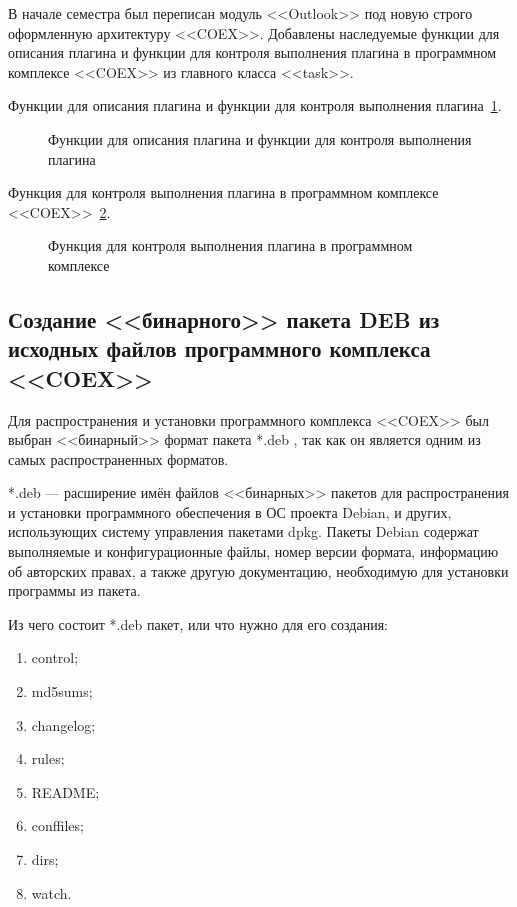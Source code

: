 В начале семестра был переписан модуль <<Outlook>> под новую строго оформленную архитектуру <<COEX>>.
Добавлены наследуемые функции для описания плагина и функции для контроля выполнения плагина в программном комплексе <<COEX>> из главного класса <<task>>.

Функции для описания плагина и функции для контроля выполнения плагина~\ref{Outlook:Outlook}.

\begin{figure}[h!]
\caption{ Функции для описания плагина и функции для контроля выполнения плагина }
\label{Outlook:Outlook}
\end{figure}

Функция для контроля выполнения плагина в программном комплексе <<COEX>>~\ref{Outlook2:Outlook2}.

\begin{figure}[h!]
\caption{ Функция для контроля выполнения плагина в программном комплексе }
\label{Outlook2:Outlook2}
\end{figure}

\subsection {Создание <<бинарного>> пакета DEB из исходных файлов программного комплекса <<COEX>>}

Для распространения и установки программного комплекса <<COEX>> был выбран <<бинарный>> формат пакета *.deb , так как он является одним из самых распространенных форматов. 

*.deb --- расширение имён файлов <<бинарных>> пакетов для распространения и установки программного обеспечения в ОС проекта Debian, и других, использующих систему управления пакетами dpkg. Пакеты Debian содержат выполняемые и конфигурационные файлы, номер версии формата, информацию об авторских правах, а также другую документацию, необходимую для установки программы из пакета.

Из чего состоит *.deb пакет, или что нужно для его создания:

\begin{enumerate}
\item control;
\item md5sums;
\item changelog;
\item rules;
\item README;
\item conffiles;
\item dirs;
\item watch.
\end{enumerate}

